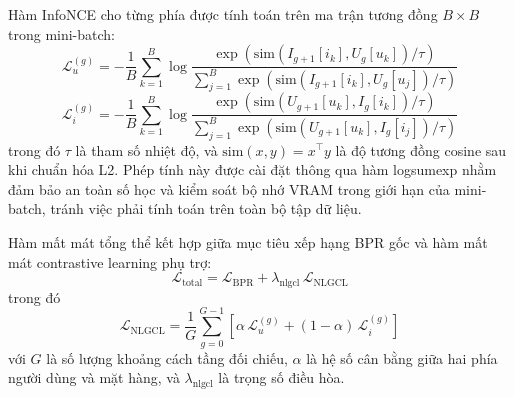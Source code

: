 Hàm InfoNCE cho từng phía được tính toán trên ma trận tương đồng $B \times B$ trong mini-batch:
\begin{equation}
\mathcal{L}_u^{(g)} = - \frac{1}{B} \sum_{k=1}^B \log \frac{\exp(\text{sim}(I_{g+1}[i_k], U_g[u_k]) / \tau)}{\sum_{j=1}^B \exp(\text{sim}(I_{g+1}[i_k], U_g[u_j]) / \tau)}
\end{equation}
\begin{equation}
\mathcal{L}_i^{(g)} = - \frac{1}{B} \sum_{k=1}^B \log \frac{\exp(\text{sim}(U_{g+1}[u_k], I_g[i_k]) / \tau)}{\sum_{j=1}^B \exp(\text{sim}(U_{g+1}[u_k], I_g[i_j]) / \tau)}
\end{equation}
trong đó $\tau$ là tham số nhiệt độ, và $\text{sim}(x, y) = x^{\top} y$ là độ tương đồng cosine sau khi chuẩn hóa L2. Phép tính này được cài đặt thông qua hàm logsumexp nhằm đảm bảo an toàn số học và kiểm soát bộ nhớ VRAM trong giới hạn của mini-batch, tránh việc phải tính toán trên toàn bộ tập dữ liệu.

Hàm mất mát tổng thể kết hợp giữa mục tiêu xếp hạng BPR gốc và hàm mất mát contrastive learning phụ trợ:
\begin{equation}
\mathcal{L}_{\text{total}} = \mathcal{L}_{\text{BPR}} + \lambda_{\text{nlgcl}} \, \mathcal{L}_{\text{NLGCL}}
\end{equation}
trong đó
\begin{equation}
\mathcal{L}_{\text{NLGCL}} = \frac{1}{G} \sum_{g=0}^{G-1} \left[ \alpha \, \mathcal{L}_u^{(g)} + (1 - \alpha) \, \mathcal{L}_i^{(g)} \right]
\end{equation}
với $G$ là số lượng khoảng cách tầng đối chiếu, $\alpha$ là hệ số cân bằng giữa hai phía người dùng và mặt hàng, và $\lambda_{\text{nlgcl}}$ là trọng số điều hòa.

